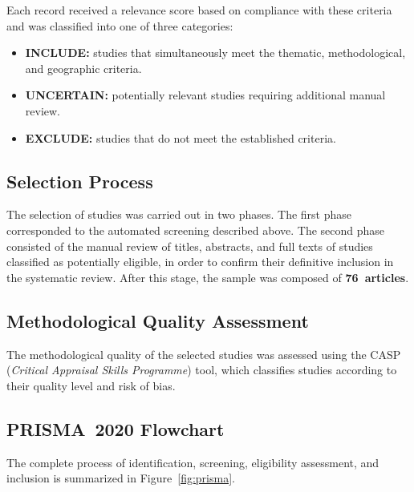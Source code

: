 \documentclass[runningheads]{llncs}
\begin{document}
Each record received a relevance score based on compliance
with these criteria and was classified into one of three
categories:

\begin{itemize}
  \item \textbf{INCLUDE:} studies that simultaneously meet
    the thematic, methodological, and geographic criteria.
  \item \textbf{UNCERTAIN:} potentially relevant studies
    requiring additional manual review.
  \item \textbf{EXCLUDE:} studies that do not meet the
    established criteria.
\end{itemize}

\subsection{Selection Process}

The selection of studies was carried out in two phases. The
first phase corresponded to the automated screening described
above. The second phase consisted of the manual review of
titles, abstracts, and full texts of studies classified as
potentially eligible, in order to confirm their definitive
inclusion in the systematic review. After this stage, the
sample was composed of \textbf{76~articles}.

\subsection{Methodological Quality Assessment}

The methodological quality of the selected studies was
assessed using the CASP (\textit{Critical Appraisal Skills
Programme}) tool, which classifies studies according to their
quality level and risk of bias.

\subsection{PRISMA~2020 Flowchart}

The complete process of identification, screening,
eligibility assessment, and inclusion is summarized in
Figure~\ref{fig:prisma}.
\end{document}
